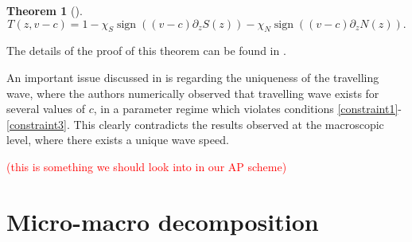 \documentclass[11pt,twoside]{article}
\theoremstyle{nonumberplain}
\DeclareMathOperator{\sign}{sign}
\newtheorem{theorem}{Theorem}%
\begin{document}
\begin{theorem}[\cite{calvez2016chemotactic}]
\[
    T(z, v-c) = 1 - \chi_S \sign((v-c)\partial_zS(z)) - \chi_N \sign((v-c)\partial_zN(z)) .
\]

\end{theorem}
The details of the proof of this theorem can be found in \cite{calvez2016chemotactic}.

\noindent An important issue discussed in \cite{calvez2018well} is regarding the uniqueness of the travelling wave, where the authors numerically observed that travelling wave exists for several values of $c$, in a parameter regime which violates conditions \eqref{constraint1}-\eqref{constraint3}. This clearly contradicts the results observed at the macroscopic level, where there exists a unique wave speed.  

\textcolor{red}{(this is something we should look into in our AP scheme)}







\section{Micro-macro decomposition}\label{sec: micro macro decomp}
\end{document}
